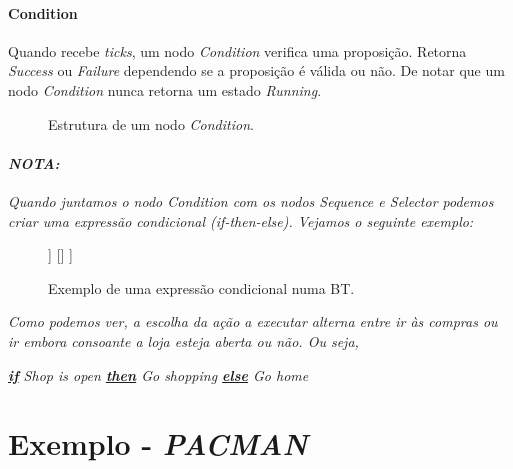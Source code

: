\paragraph{Condition}{
    Quando recebe \textit{ticks}, um nodo \textit{Condition} verifica uma proposição.
    Retorna \textit{Success} ou \textit{Failure} dependendo se a proposição é válida ou não.
    De notar que um nodo \textit{Condition} nunca retorna um estado \textit{Running}.

    \begin{figure}[H]
    \centering
    \begin{behavior}
    \end{behavior}
    \caption{Estrutura de um nodo \textit{Condition}.}
    \label{fig:2.7}
    \end{figure}

    \hr
    \paragraph{\textit{NOTA:}}{
        \textit{
        Quando juntamos o nodo Condition com os nodos Sequence e Selector podemos criar uma expressão condicional (if-then-else). Vejamos o seguinte exemplo:
        }
        \begin{figure}[H]
        \centering
        \begin{behavior}
            [\selector
                [\sequence
                    [\condition{Shop is open}]
                    [\action{Go shopping}]
                ]
                []
            ]
        \end{behavior}
        \caption{Exemplo de uma expressão condicional numa BT.}
        \label{fig:2.8}
        \end{figure}

        \textit{
        Como podemos ver, a escolha da ação a executar alterna entre ir às compras ou ir embora consoante a loja esteja aberta ou não. Ou seja,
        }

        \begin{center}
            \textit{
            \underline{\textbf{if}} Shop is open \underline{\textbf{then}} Go shopping \underline{\textbf{else}} Go home
            }
        \end{center}
    }
    \hr
}






\section{Exemplo - \textit{PACMAN}}


